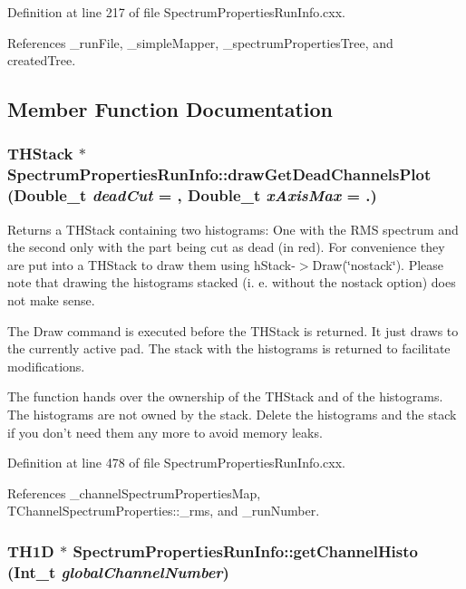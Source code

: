 Definition at line 217 of file SpectrumPropertiesRunInfo.cxx.

References \_\-runFile, \_\-simpleMapper, \_\-spectrumPropertiesTree, and createdTree.

\subsection{Member Function Documentation}
\hypertarget{class_spectrum_properties_run_info_a4cce9dcb12a35b4c43d6e6efdd906b01}{
\subsubsection[{drawGetDeadChannelsPlot}]{\setlength{\rightskip}{0pt plus 5cm}THStack $\ast$ SpectrumPropertiesRunInfo::drawGetDeadChannelsPlot (Double\_\-t {\em deadCut} = {}, \/  Double\_\-t {\em xAxisMax} = {.})}}
\label{class_spectrum_properties_run_info_a4cce9dcb12a35b4c43d6e6efdd906b01}


Returns a THStack containing two histograms: One with the RMS spectrum and the second only with the part being cut as dead (in red). For convenience they are put into a THStack to draw them using {\ttfamily hStack-\/$>$Draw}(\char`\"{}nostack\char`\"{}). Please note that drawing the histograms stacked (i. e. without the {\ttfamily nostack} option) does not make sense.

The Draw command is executed before the THStack is returned. It just draws to the currently active pad. The stack with the histograms is returned to facilitate modifications.

The function hands over the ownership of the THStack and of the histograms. The histograms are not owned by the stack. Delete the histograms and the stack if you don't need them any more to avoid memory leaks. 

Definition at line 478 of file SpectrumPropertiesRunInfo.cxx.

References \_\-channelSpectrumPropertiesMap, TChannelSpectrumProperties::\_\-rms, and \_\-runNumber.\hypertarget{class_spectrum_properties_run_info_a3674726bcbfef46f67f6c280de88457f}{
\subsubsection[{getChannelHisto}]{\setlength{\rightskip}{0pt plus 5cm}TH1D $\ast$ SpectrumPropertiesRunInfo::getChannelHisto (Int\_\-t {\em globalChannelNumber})}}
\label{class_spectrum_properties_run_info_a3674726bcbfef46f67f6c280de88457f}


